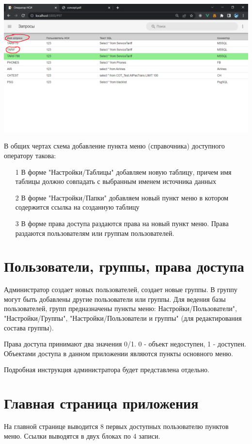 \documentclass[12pt, a4paper]{article}
\begin{document}
\begin{center}
    \includegraphics [width=\textwidth] {p4.png}
\end{center}

В общих чертах схема добавление пункта меню (справочника) доступного оператору такова:

\begin{itemize}
    \item [1] {В форме "Настройки/Таблицы" добавляем новую таблицу, причем имя таблицы должно совпадать с выбранным именем источника данных}
    \item [2] {В форме "Настройки/Папки" добавляем новый пункт меню в котором содержится ссылка на созданную таблицу}
    \item [3] {В форме права доступа раздаются права на новый пункт меню. Права раздаются пользователям или группам пользователей.}
\end{itemize}

\section{Пользователи, группы, права доступа}
Администратор создает новых пользователей, создает новые группы. В группу могут быть добавлены другие пользователи или
группы. Для ведения базы пользователей, групп предназначены пункты меню: Настройки/Пользователи", "Настройки/Группы",
"Настройки/Пользователи и группы" (для редактирования состава группы).

Права доступа принимают два значения 0/1. 0 - объект недоступен, 1 - доступен. 
Объектами доступа в данном приложении являются пункты основного меню.

Подробная инструкция администратора будет представлена отдельно.

\section{Главная страница приложения}
На главной странице выводится 8 первых доступных пользователю пунктов меню. Ссылки выводятся в двух блоках
по 4 записи.
\end{document}
